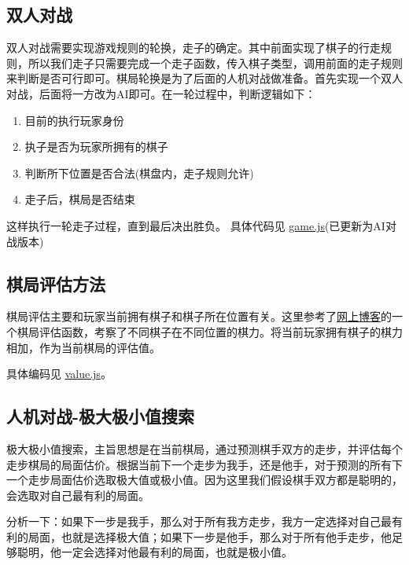 \subsection{双人对战}

双人对战需要实现游戏规则的轮换，走子的确定。其中前面实现了棋子的行走规则，所以我们走子只需要完成一个走子函数，传入棋子类型，调用前面的走子规则来判断是否可行即可。棋局轮换是为了后面的人机对战做准备。首先实现一个双人对战，后面将一方改为AI即可。在一轮过程中，判断逻辑如下：
\begin{enumerate}
    \item 目前的执行玩家身份
    \item 执子是否为玩家所拥有的棋子
    \item 判断所下位置是否合法(棋盘内，走子规则允许)
    \item 走子后，棋局是否结束
\end{enumerate}
这样执行一轮走子过程，直到最后决出胜负。
具体代码见 \underline{\href{https://github.com/xwy27/ArtificialIntelligenceProjects/blob/master/AI_Web/static/js/ChineseChess/game.js}{game.js}}(已更新为AI对战版本)

\subsection{棋局评估方法}

棋局评估主要和玩家当前拥有棋子和棋子所在位置有关。这里参考了\href{http://www.cnblogs.com/royhoo/p/6425658.html}{网上博客}的一个棋局评估函数，考察了不同棋子在不同位置的棋力。将当前玩家拥有棋子的棋力相加，作为当前棋局的评估值。

具体编码见 \underline{\href{https://github.com/xwy27/ArtificialIntelligenceProjects/blob/master/AI_Web/static/js/ChineseChess/value}{value.js}}。

\subsection{人机对战-极大极小值搜索}

极大极小值搜索，主旨思想是在当前棋局，通过预测棋手双方的走步，并评估每个走步棋局的局面估价。根据当前下一个走步为我手，还是他手，对于预测的所有下一个走步局面估价选取极大值或极小值。因为这里我们假设棋手双方都是聪明的，会选取对自己最有利的局面。

分析一下：如果下一步是我手，那么对于所有我方走步，我方一定选择对自己最有利的局面，也就是选择极大值；如果下一步是他手，那么对于所有他手走步，他足够聪明，他一定会选择对他最有利的局面，也就是极小值。

